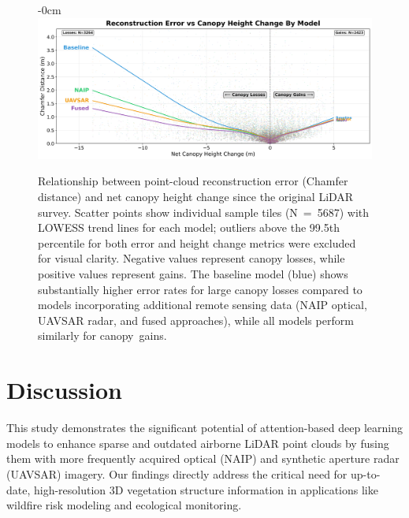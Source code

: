 \documentclass[remotesensing,article,accept,pdftex,moreauthors]{Definitions/mdpi}
\renewcommand{\hl}[1]{#1}
\begin{document}
\begin{figure}[H]
\begin{adjustwidth}{-\extralength}{0cm}
    \centering
    \includegraphics[width=1\linewidth]{figures/error_vs_cnpy_chng.png}
    \end{adjustwidth}
    \caption{\hl{Relationship} %
 between point-cloud reconstruction error (Chamfer distance) and net canopy height change since the original LiDAR survey. Scatter points show individual sample tiles \mbox{(N = 5687)} with LOWESS trend lines for each model; outliers above the 99.5th percentile for both error and height change metrics were excluded for visual clarity. Negative values represent canopy losses, while positive values represent gains. The baseline model (blue) shows substantially higher error rates for large canopy losses compared to models incorporating additional remote sensing data (NAIP optical, UAVSAR radar, and fused approaches), while all models perform similarly for \mbox{canopy gains}.}
    \label{fig:error_vs_cnpy_chng}
\end{figure}

\section{Discussion}



This study demonstrates the significant potential of attention-based deep learning models to enhance sparse and outdated airborne LiDAR point clouds by fusing them with more frequently acquired optical (NAIP) and synthetic aperture radar (UAVSAR) imagery. Our findings directly address the critical need for up-to-date, high-resolution 3D vegetation structure information in applications like wildfire risk modeling and ecological monitoring.
\end{document}
